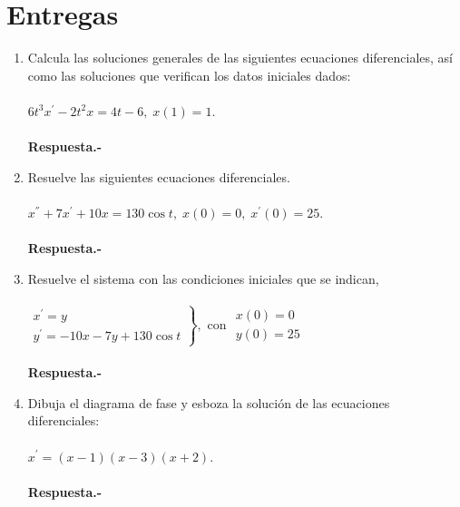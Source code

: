 \section*{\center Entregas}
\vspace{1cm}

\begin{enumerate}[\bfseries 1.]

    \item Calcula las soluciones generales de las siguientes ecuaciones diferenciales, así como las soluciones que verifican los datos iniciales dados:\\\\
	$6t^3x^{'}-2t^2x=4t-6,\; x(1)=1$.\\\\	
	\textbf{Respuesta.-}\; 

    \item Resuelve las siguientes ecuaciones diferenciales.\\\\
	$x^{''}+7x^{'}+10x=130 \cos t, \; x(0)=0,\; x^{'}(0)=25$.\\\\
	\textbf{Respuesta.-}\; 

    \item Resuelve el sistema con las condiciones iniciales que se indican,\\\\
	$\left.\begin{array}{l}x^{'}=y \\ y^{'}=-10x-7y+130\cos t \end{array}\right\},$ con $\begin{array}{l} x(0)=0 \\ y(0)=25 \end{array}$\\\\

	\textbf{Respuesta.-}\; 

    \item Dibuja el diagrama de fase y esboza la solución de las ecuaciones diferenciales:\\\\
	$x^{'}=(x-1)(x-3)(x+2)$.\\\\
	\textbf{Respuesta.-}\; 

\end{enumerate}
